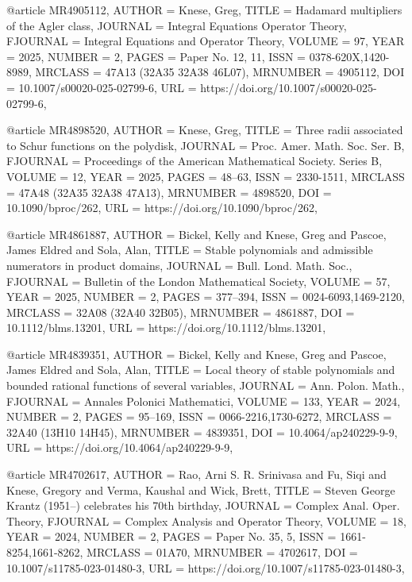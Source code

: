 @article {MR4905112,
    AUTHOR = {Knese, Greg},
     TITLE = {Hadamard multipliers of the {A}gler class},
   JOURNAL = {Integral Equations Operator Theory},
  FJOURNAL = {Integral Equations and Operator Theory},
    VOLUME = {97},
      YEAR = {2025},
    NUMBER = {2},
     PAGES = {Paper No. 12, 11},
      ISSN = {0378-620X,1420-8989},
   MRCLASS = {47A13 (32A35 32A38 46L07)},
  MRNUMBER = {4905112},
       DOI = {10.1007/s00020-025-02799-6},
       URL = {https://doi.org/10.1007/s00020-025-02799-6},
}

@article {MR4898520,
    AUTHOR = {Knese, Greg},
     TITLE = {Three radii associated to {S}chur functions on the polydisk},
   JOURNAL = {Proc. Amer. Math. Soc. Ser. B},
  FJOURNAL = {Proceedings of the American Mathematical Society. Series B},
    VOLUME = {12},
      YEAR = {2025},
     PAGES = {48--63},
      ISSN = {2330-1511},
   MRCLASS = {47A48 (32A35 32A38 47A13)},
  MRNUMBER = {4898520},
       DOI = {10.1090/bproc/262},
       URL = {https://doi.org/10.1090/bproc/262},
}

@article {MR4861887,
    AUTHOR = {Bickel, Kelly and Knese, Greg and Pascoe, James Eldred and
              Sola, Alan},
     TITLE = {Stable polynomials and admissible numerators in product
              domains},
   JOURNAL = {Bull. Lond. Math. Soc.},
  FJOURNAL = {Bulletin of the London Mathematical Society},
    VOLUME = {57},
      YEAR = {2025},
    NUMBER = {2},
     PAGES = {377--394},
      ISSN = {0024-6093,1469-2120},
   MRCLASS = {32A08 (32A40 32B05)},
  MRNUMBER = {4861887},
       DOI = {10.1112/blms.13201},
       URL = {https://doi.org/10.1112/blms.13201},
}

@article {MR4839351,
    AUTHOR = {Bickel, Kelly and Knese, Greg and Pascoe, James Eldred and
              Sola, Alan},
     TITLE = {Local theory of stable polynomials and bounded rational
              functions of several variables},
   JOURNAL = {Ann. Polon. Math.},
  FJOURNAL = {Annales Polonici Mathematici},
    VOLUME = {133},
      YEAR = {2024},
    NUMBER = {2},
     PAGES = {95--169},
      ISSN = {0066-2216,1730-6272},
   MRCLASS = {32A40 (13H10 14H45)},
  MRNUMBER = {4839351},
       DOI = {10.4064/ap240229-9-9},
       URL = {https://doi.org/10.4064/ap240229-9-9},
}

@article {MR4702617,
    AUTHOR = {Rao, Arni S. R. Srinivasa and Fu, Siqi and Knese, Gregory and
              Verma, Kaushal and Wick, Brett},
     TITLE = {Steven {G}eorge {K}rantz (1951--) celebrates his 70th
              birthday},
   JOURNAL = {Complex Anal. Oper. Theory},
  FJOURNAL = {Complex Analysis and Operator Theory},
    VOLUME = {18},
      YEAR = {2024},
    NUMBER = {2},
     PAGES = {Paper No. 35, 5},
      ISSN = {1661-8254,1661-8262},
   MRCLASS = {01A70},
  MRNUMBER = {4702617},
       DOI = {10.1007/s11785-023-01480-3},
       URL = {https://doi.org/10.1007/s11785-023-01480-3},
}

